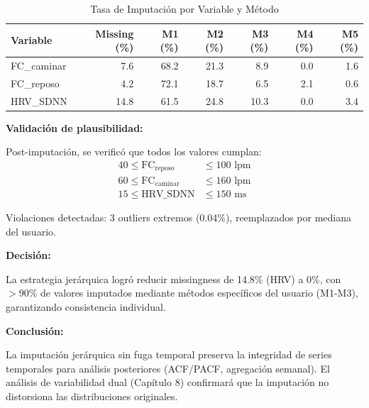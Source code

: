 \documentclass[12pt,letterpaper,twoside]{report}
\begin{document}
\begin{table}[H]
\centering
\caption{Tasa de Imputación por Variable y Método}
\label{tab:imputation_rates}
\begin{tabular}{@{}lrrrrrr@{}}
\toprule
\textbf{Variable} & \textbf{Missing (\%)} & \textbf{M1 (\%)} & \textbf{M2 (\%)} & \textbf{M3 (\%)} & \textbf{M4 (\%)} & \textbf{M5 (\%)} \\
\midrule
FC\_caminar   & 7.6 & 68.2 & 21.3 & 8.9  & 0.0 & 1.6 \\
FC\_reposo    & 4.2 & 72.1 & 18.7 & 6.5  & 2.1 & 0.6 \\
HRV\_SDNN     & 14.8 & 61.5 & 24.8 & 10.3 & 0.0 & 3.4 \\
\bottomrule
\end{tabular}
\end{table}

\begin{calculobox}
\textbf{Validación de plausibilidad:}

Post-imputación, se verificó que todos los valores cumplan:
\begin{align}
40 \leq \text{FC}_{\text{reposo}} &\leq 100 \text{ lpm} \\
60 \leq \text{FC}_{\text{caminar}} &\leq 160 \text{ lpm} \\
15 \leq \text{HRV\_SDNN} &\leq 150 \text{ ms}
\end{align}

Violaciones detectadas: 3 outliers extremos (0.04\%), reemplazados por mediana del usuario.
\end{calculobox}

\begin{decisionbox}
\textbf{Decisión:}

La estrategia jerárquica logró reducir missingness de 14.8\% (HRV) a 0\%, con $>90\%$ de valores imputados mediante métodos específicos del usuario (M1-M3), garantizando consistencia individual.
\end{decisionbox}

\begin{conclusionbox}
\textbf{Conclusión:}

La imputación jerárquica sin fuga temporal preserva la integridad de series temporales para análisis posteriores (ACF/PACF, agregación semanal). El análisis de variabilidad dual (Capítulo 8) confirmará que la imputación no distorsiona las distribuciones originales.
\end{conclusionbox}

\end{document}
